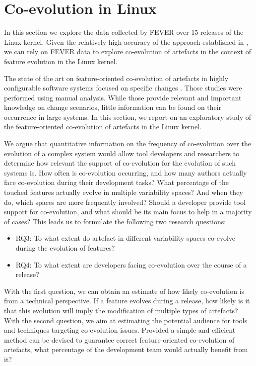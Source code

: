 \section{Co-evolution in Linux}
\label{sec:coevolution}

In this section we explore the data collected by FEVER over 15 releases of the Linux kernel.
Given the relatively high accuracy of the approach established in , 
we can rely on FEVER data to explore co-evolution of artefacts in the context of feature evolution in the Linux kernel.

The state of the art on feature-oriented co-evolution of artefacts in highly configurable software systems
focused on specific changes \citep{passos_coevolution_2015,neves_safe_2015,neves_investigating_2011}.
Those studies were performed using manual analysis. While those provide relevant and important 
knowledge on change scenarios, little information can be found on their occurrence 
in large systems. 
In this section, we report on an exploratory study of the feature-oriented co-evolution of artefacts in the Linux kernel. 

We argue that quantitative information on the frequency of co-evolution over the evolution of a complex system
would allow tool developers and researchers to determine how relevant the support of co-evolution for the evolution of such systems is.
How often is co-evolution occurring, and how many authors actually face co-evolution during their development tasks?
What percentage of the touched features actually evolve in multiple variability spaces? And when they do, which spaces 
are more frequently involved? 
Should a developer provide tool support for co-evolution, and what should be its main focus to help in a majority of cases? 
This leads us to formulate the following two research questions: 
\begin{itemize}
\item RQ3: To what extent do artefact in different variability spaces co-evolve during the evolution of features?
\item RQ4: To what extent are developers facing co-evolution over the course of a release?
\end{itemize}

With the first question, we can obtain an estimate of how likely co-evolution is from a technical perspective.
If a feature evolves during a release, how likely is it that this evolution will imply the modification of multiple types of artefacts?
With the second question, we aim at estimating the potential audience for tools and techniques
targeting co-evolution issues.
Provided a simple and efficient method can be devised to guarantee correct feature-oriented co-evolution
of artefacts, what percentage of the development team would actually benefit from it?

